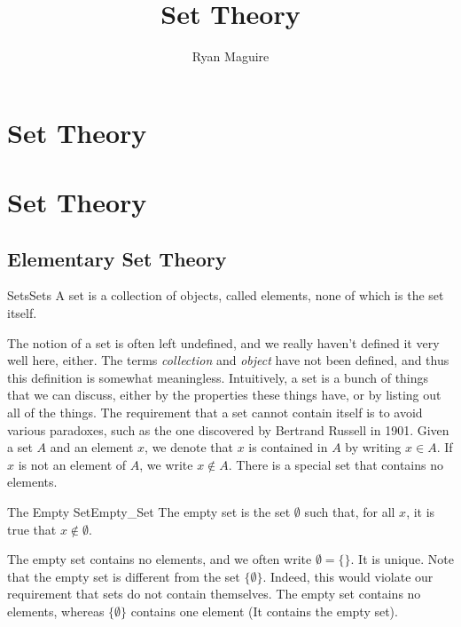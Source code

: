 \documentclass[crop=false,class=book,oneside]{standalone}
\begin{document}
    \ifx\ifmain\undefined
        \title{Set Theory}
        \author{Ryan Maguire}
        \date{\vspace{-5ex}}
        \maketitle
        \tableofcontents
        \clearpage
        \chapter*{Set Theory}
        \vspace{10ex}
        \setcounter{chapter}{1}
    \else
        \chapter{Set Theory}
    \fi
    \section{Elementary Set Theory}
        \begin{ldefinition}{Sets}{Sets}
            A set is a collection of objects, called elements,
            none of which is the set itself.
        \end{ldefinition}
        The notion of a \textrm{set} is often left undefined,
        and we really haven't defined it very well here, either.
        The terms \textit{collection} and \textit{object} have
        not been defined, and thus this definition is somewhat
        meaningless. Intuitively, a set is a bunch of things that
        we can discuss, either by the properties these things
        have, or by listing out all of the things. The
        requirement that a set cannot contain itself is to avoid
        various paradoxes, such as the one discovered by Bertrand
        Russell in 1901. Given a set $A$ and an element $x$, we
        denote that $x$ is contained in $A$ by writing $x\in{A}$.
        If $x$ is not an element of $A$, we write $x\notin{A}$.
        There is a special set that contains no elements.
        \begin{ldefinition}{The Empty Set}{Empty_Set}
            The \gls{empty set} is the set $\emptyset$ such that,
            for all $x$, it is true that $x\notin\emptyset$.
        \end{ldefinition}
        The empty set contains no elements, and we often write
        $\emptyset=\{\}$. It is unique. Note that the empty set
        is different from the set $\{\emptyset\}$. Indeed, this
        would violate our requirement that sets do not contain
        themselves. The empty set contains no elements, whereas
        $\{\emptyset\}$ contains one element (It contains the
        empty set).
\end{document}
